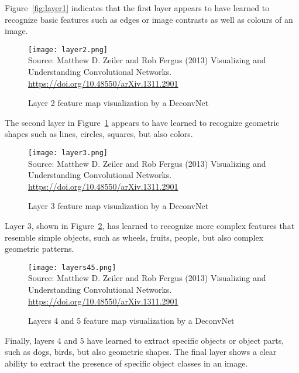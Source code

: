 Figure~\ref{fig:layer1} indicates that the first layer appears to have learned to recognize basic features such as edges or image contrasts as well as colours of an image. 

\begin{figure}
\centering
\texttt{[image: layer2.png]} \\
\vspace{\baselineskip}
\scriptsize Source: Matthew D. Zeiler and Rob Fergus (2013) Visualizing and Understanding Convolutional Networks. \url{https://doi.org/10.48550/arXiv.1311.2901}
\caption{Layer 2 feature map visualization by a DeconvNet}
\label{fig:layer2}
\end{figure}

The second layer in Figure~\ref{fig:layer2} appears to have learned to recognize geometric shapes such as lines, circles, squares, but also colors.

\begin{figure}
\centering
\texttt{[image: layer3.png]} \\
\vspace{\baselineskip}
\scriptsize Source: Matthew D. Zeiler and Rob Fergus (2013) Visualizing and Understanding Convolutional Networks. \url{https://doi.org/10.48550/arXiv.1311.2901}
\caption{Layer 3 feature map visualization by a DeconvNet}
\label{fig:layer3}
\end{figure}

Layer 3, shown in Figure~\ref{fig:layer3}, has learned to recognize more complex features that resemble simple objects, such as wheels, fruits, people, but also complex geometric patterns. 

\begin{figure}
\centering
\texttt{[image: layers45.png]} \\
\vspace{0.5\baselineskip}
\scriptsize Source: Matthew D. Zeiler and Rob Fergus (2013) Visualizing and Understanding Convolutional Networks. \url{https://doi.org/10.48550/arXiv.1311.2901}
\caption{Layers 4 and 5 feature map visualization by a DeconvNet}
\label{fig:layer45}
\end{figure}

Finally, layers 4 and 5 have learned to extract specific objects or object parts, such as dogs, birds, but also geometric shapes. The final layer shows a clear ability to extract the presence of specific object classes in an image. 

\FloatBarrier

